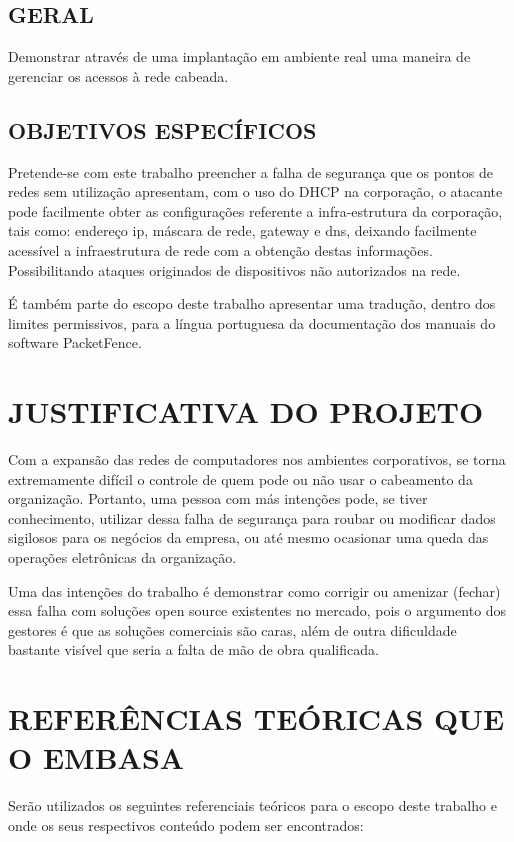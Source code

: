 \documentclass[brazil, ruledheader, pnumromarab,normaltoc]{abnt}
\begin{document}
\section{GERAL}
Demonstrar através de uma implantação em ambiente real uma maneira de gerenciar os acessos à rede cabeada.

\section{OBJETIVOS ESPECÍFICOS}
Pretende-se com este trabalho preencher a falha de segurança que os pontos de redes sem utilização apresentam, com o uso do DHCP na corporação, o atacante pode facilmente obter  as configurações referente a infra-estrutura da corporação, tais como: endereço ip, máscara de rede, gateway e dns, deixando facilmente acessível a infraestrutura de rede com a obtenção destas informações. Possibilitando ataques originados de dispositivos não autorizados na rede.
\par
 É também parte do escopo deste trabalho apresentar uma tradução, dentro dos limites permissivos, para a língua portuguesa da documentação dos manuais do software PacketFence.

\chapter{JUSTIFICATIVA DO PROJETO}
Com a expansão das redes de computadores nos ambientes corporativos, se torna extremamente difícil o controle de quem pode ou não usar o cabeamento da organização. Portanto, uma pessoa com más intenções pode, se tiver conhecimento, utilizar dessa falha de segurança para roubar ou modificar dados sigilosos para os negócios da empresa, ou até mesmo ocasionar uma queda das operações eletrônicas da organização.
\par
Uma das intenções do trabalho é demonstrar como corrigir ou amenizar (fechar) essa falha com soluções open source existentes no mercado, pois o argumento dos gestores é que as soluções comerciais são caras, além de outra dificuldade bastante visível que seria a falta de mão de obra qualificada.

\chapter{REFERÊNCIAS TEÓRICAS QUE O EMBASA}
Serão utilizados os seguintes referenciais teóricos para o escopo deste trabalho e onde os seus respectivos conteúdo podem ser encontrados:
\end{document}
